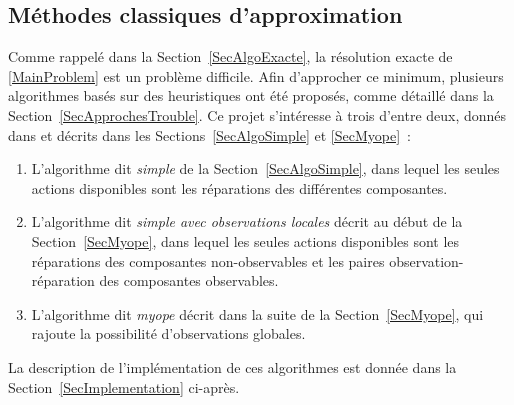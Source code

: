 \documentclass[a4paper,11pt]{article}
\theoremstyle{plain}
\theoremstyle{definition}
\begin{document}
\subsection{Méthodes classiques d'approximation}
\label{SecMethodesClassiques}

Comme rappelé dans la Section~\ref{SecAlgoExacte}, la résolution exacte de \eqref{MainProblem} est un problème difficile. Afin d'approcher ce minimum, plusieurs algorithmes basés sur des heuristiques ont été proposés, comme détaillé dans la Section~\ref{SecApprochesTrouble}. Ce projet s'intéresse à trois d'entre deux, donnés dans \cite{Heckerman_1995, heckerman1994troubleshooting} et décrits dans les Sections~\ref{SecAlgoSimple} et \ref{SecMyope}~:
\begin{enumerate}
\item L'algorithme dit \emph{simple} de la Section~\ref{SecAlgoSimple}, dans lequel les seules actions disponibles sont les réparations des différentes composantes.

\item L'algorithme dit \emph{simple avec observations locales} décrit au début de la Section~\ref{SecMyope}, dans lequel les seules actions disponibles sont les réparations des composantes non-observables et les paires observation-réparation des composantes observables.

\item L'algorithme dit \emph{myope} décrit dans la suite de la Section~\ref{SecMyope}, qui rajoute la possibilité d'observations globales.
\end{enumerate}
La description de l'implémentation de ces algorithmes est donnée dans la Section~\ref{SecImplementation} ci-après.

\end{document}
